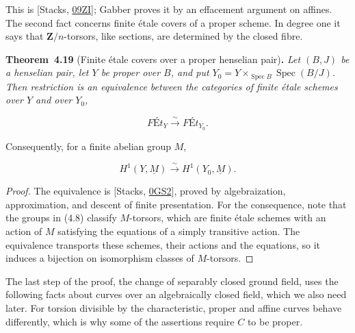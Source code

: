 \documentclass[11pt]{article}
\newenvironment{bpstatement}[2]{\par\addvspace{0.6\baselineskip}\noindent\textbf{#1}#2\textbf{.}\enspace\ignorespaces}
  {\par\addvspace{0.4\baselineskip}}
\newenvironment{bpstatementit}[2]{\begin{bpstatement}{#1}{#2}\itshape\ignorespaces}{\end{bpstatement}}
\begin{document}
\label{bp336}%
This is [Stacks, \href{https://stacks.math.columbia.edu/tag/09ZI}{09ZI}]; Gabber proves it by an effacement argument on affines. The second fact concerns finite étale covers of a proper scheme. In degree one it says that \(\mathbf Z/n\)-torsors, like sections, are determined by the closed fibre.

\label{bp337}%
\begin{bpstatementit}{Theorem~4.19}{ (Finite étale covers over a proper henselian pair)}
Let \((B,J)\) be a henselian pair, let \(Y\) be proper over \(B\), and put \(Y_0=Y\times_{\operatorname{Spec}B}\operatorname{Spec}(B/J)\). Then restriction is an equivalence between the categories of finite étale schemes over \(Y\) and over \(Y_0\),

\[
\textit{F\'Et}_Y\xrightarrow{\sim}\textit{F\'Et}_{Y_0}.
\]

Consequently, for a finite abelian group \(M\),

\[
H^1(Y,\underline M)\xrightarrow{\sim}H^1(Y_0,\underline M).
\tag{4.8}
\]
\end{bpstatementit}

\begin{proof}[{Proof}]\label{bp338}%
The equivalence is [Stacks, \href{https://stacks.math.columbia.edu/tag/0GS2}{0GS2}], proved by algebraization, approximation, and descent of finite presentation. For the consequence, note that the groups in (4.8) classify \(M\)-torsors, which are finite étale schemes with an action of \(M\) satisfying the equations of a simply transitive action. The equivalence transports these schemes, their actions and the equations, so it induces a bijection on isomorphism classes of \(M\)-torsors.
\end{proof}

\label{bp339}%
The last step of the proof, the change of separably closed ground field, uses the following facts about curves over an algebraically closed field, which we also need later. For torsion divisible by the characteristic, proper and affine curves behave differently, which is why some of the assertions require \(C\) to be proper.
\end{document}
